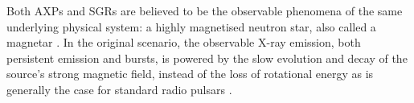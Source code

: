 \documentclass[12pt]{emulateapj}
\begin{document}
Both AXPs and SGRs are believed to be the observable phenomena of the same underlying physical system: a highly magnetised
neutron star, also called a magnetar \citep{duncan1992,thompson1995}. In the original scenario, the observable X-ray emission, both persistent emission and bursts, 
is powered by the slow evolution and decay of the source's strong magnetic field, instead of the loss of rotational energy as 
is generally the case for standard radio pulsars \citep{thompson1995,thompson2001}. 


\end{document}
